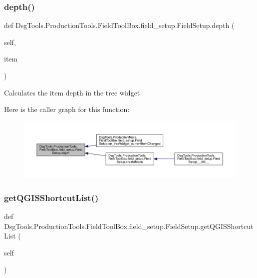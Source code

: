 \subsubsection{\texorpdfstring{depth()}{depth()}}
{\footnotesize\ttfamily def Dsg\+Tools.\+Production\+Tools.\+Field\+Tool\+Box.\+field\+\_\+setup.\+Field\+Setup.\+depth (\begin{DoxyParamCaption}\item[{}]{self,  }\item[{}]{item }\end{DoxyParamCaption})}

\begin{DoxyVerb}Calculates the item depth in the tree widget
\end{DoxyVerb}
 Here is the caller graph for this function\+:
\nopagebreak
\begin{figure}[H]
\begin{center}
\leavevmode
\includegraphics[width=350pt]{class_dsg_tools_1_1_production_tools_1_1_field_tool_box_1_1field__setup_1_1_field_setup_aee4760d72fd7cb7642f05ca025a54336_icgraph}
\end{center}
\end{figure}
\mbox{\label{class_dsg_tools_1_1_production_tools_1_1_field_tool_box_1_1field__setup_1_1_field_setup_aacb16eac193873596242500308f5b612}} 
\subsubsection{\texorpdfstring{get\+Q\+G\+I\+S\+Shortcut\+List()}{getQGISShortcutList()}}
{\footnotesize\ttfamily def Dsg\+Tools.\+Production\+Tools.\+Field\+Tool\+Box.\+field\+\_\+setup.\+Field\+Setup.\+get\+Q\+G\+I\+S\+Shortcut\+List (\begin{DoxyParamCaption}\item[{}]{self }\end{DoxyParamCaption})}

